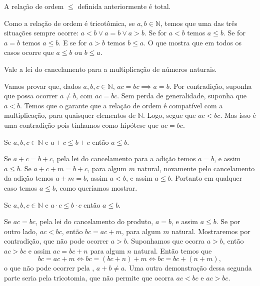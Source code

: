 \documentclass[../main.tex]{subfiles}
\begin{document}
\begin{dem}
\begin{enumerate}[label=(\roman*)]
     \end{enumerate}
\end{dem}

\begin{corol}\label{nat-corol-total}
    A relação de ordem $\leq$ definida anteriormente é total.
\end{corol}
\begin{dem}
    Como a relação de ordem é tricotômica, se $a,b \in \mathbb{N}$, temos que uma das três situações sempre ocorre:
    $a < b \lor a=b \lor a > b$. Se for $a < b$ temos $a \leq b$. Se for $a = b$ temos $a \leq b$. E se for $a > b$ temos $b \leq a$. O que mostra que em todos os casos ocorre que $a \leq b$ ou $b \leq a$.
\end{dem}

\begin{corol}
    Vale a lei do cancelamento para a multiplicação de números naturais.
\end{corol}
\begin{dem}
    Vamos provar que, dados $a,b,c \in \mathbb{N}$, $ac = bc \implies a=b$. Por contradição, suponha que possa ocorrer $a \neq b$, com $ac = bc$.
    Sem perda de generalidade, suponha que $a < b$. Temos que o  garante que a relação de ordem é compatível com a multiplicação, para quaisquer elementos de $\mathbb{N}$. Logo, segue que $ac < bc$. Mas isso é uma contradição pois tínhamos como hipótese que $ac=bc$.
\end{dem}

\begin{prop}
    Se $a,b,c \in \mathbb{N}$ e $a + c \leq b + c$ então $a \leq b$.
\end{prop}
\begin{dem}
    Se $a + c = b + c$, pela lei do cancelamento para a adição temos $a=b $, e assim $ a \leq b$.
    Se $a + c + m = b + c$, para algum $m$ natural, novamente pelo cancelamento da adição temos $a+m = b$, assim $a < b $, e assim $a \leq b$. Portanto em qualquer caso temos $a \leq b$, como queríamos mostrar.
\end{dem}
\begin{prop}
    Se $a,b,c \in \mathbb{N}$ e $a \cdot c \leq b \cdot c$ então $a \leq b$.
\end{prop}
\begin{dem}
    Se $ac = bc$, pela lei do cancelamento do produto, $a=b $, e assim $ a \leq b$.
    Se por outro lado, $ac < bc$, então $bc = ac + m$, para algum $m$ natural. Mostraremos por contradição, que não pode ocorrer $a > b$.
    Suponhamos que ocorra $a > b$, então $ac > bc$ e assim $ac = bc + n$ para algum $n$ natural. Então temos que 
    \[ bc = ac + m \iff bc = (bc + n) + m \iff bc = bc + (n + m), \] 
    o que não pode ocorrer pela , $a+b \neq a$. Uma outra demonstração dessa segunda parte seria pela tricotomia, que não permite que ocorra $ac < bc $ e $ac > bc$.
\end{dem}
\end{document}
